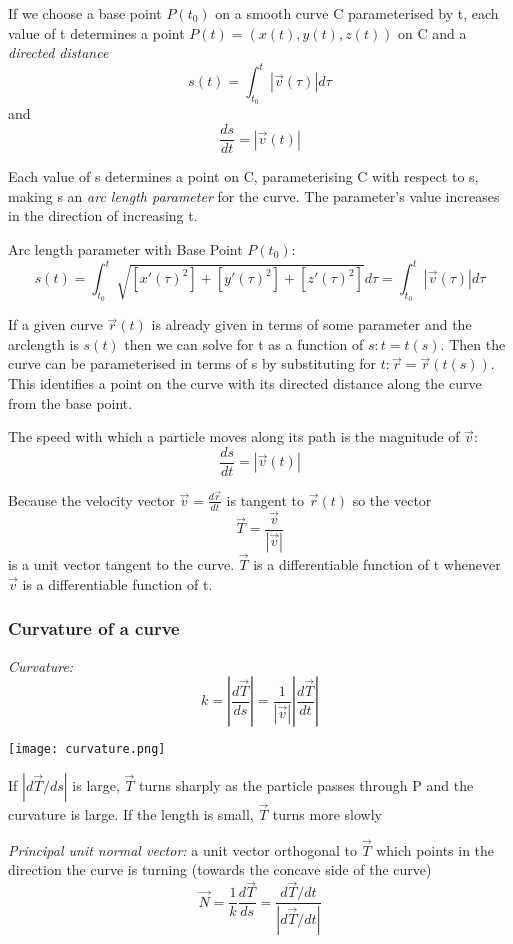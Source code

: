 \documentclass[12pt]{article}
\begin{document}
If we choose a base point $P(t_0)$ on a smooth curve C parameterised by t, each value of t determines a point $P(t) = (x(t), y(t), z(t))$ on C and a \emph{directed distance}
\[s(t) = \int_{t_0}^t |\vec{v}(\tau)| d \tau\]
and 
\[\frac{ds}{dt} = |\vec{v}(t)|\]

Each value of s determines a point on C, parameterising C with respect to s, making s an \emph{arc length parameter} for the curve. The parameter's value increases in the direction of increasing t. 

Arc length parameter with Base Point $P(t_0)$:
\[s(t) = \int_{t_0}^t \sqrt{[x'(\tau)^2] + [y'(\tau)^2] + [z'(\tau)^2]} d\tau = \int_{t_0}^t |\vec{v}(\tau)| d\tau\]

If a given curve $\vec{r}(t)$ is already given in terms of some parameter and the arclength is $s(t)$ then we can solve for t as a function of $s: t = t(s)$. Then the curve can be parameterised in terms of s by substituting for $t: \vec{r} = \vec{r} (t(s))$. This identifies a point on the curve with its directed distance along the curve from the base point. 

The speed with which a particle moves along its path is the magnitude of $\vec{v}$:
\[\frac{ds}{dt} = |\vec{v}(t)|\]

Because the velocity vector $\vec{v} = \frac{d\vec{r}}{dt}$ is tangent to $\vec{r}(t)$ so the vector 
\[\vec{T} = \frac{\vec{v}}{|\vec{v}|}\]
is a unit vector tangent to the curve. $\vec{T}$ is a differentiable function of t whenever $\vec{v}$ is a differentiable function of t. 

\subsubsection{Curvature of a curve}
\emph{Curvature:}
\[k = \left| \frac{d\vec{T}}{ds}\right| = \frac{1}{|\vec{v}|} \left| \frac{d\vec{T}}{dt} \right|\]
\begin{center}
    \texttt{[image: curvature.png]}
\end{center}

If $|d\vec{T}/ds|$ is large, $\vec{T}$ turns sharply as the particle passes through P and the curvature is large. If the length is small, $\vec{T}$ turns more slowly

\emph{Principal unit normal vector:} a unit vector orthogonal to $\vec{T}$ which points in the direction the curve is turning (towards the concave side of the curve)
\[\vec{N} = \frac{1}{k} \frac{d\vec{T}}{ds} = \frac{d\vec{T}/dt}{|d\vec{T}/dt|}\]
\end{document}
